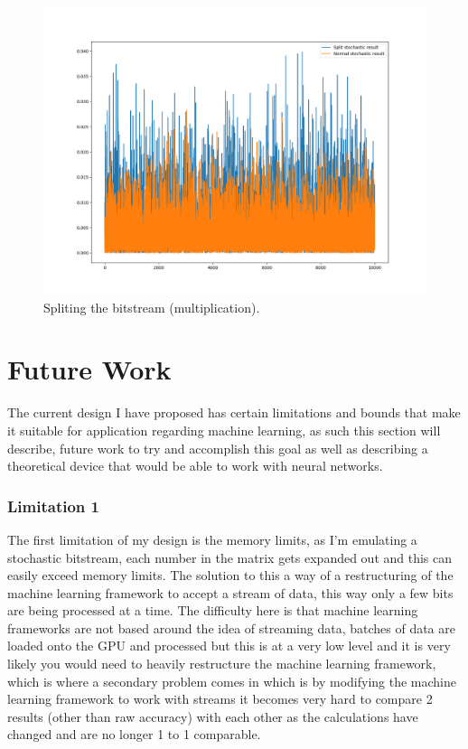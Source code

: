 \documentclass[a4paper,oneside,phd,etd]{BYUPhys}
\begin{document}
\begin{figure}[H]
\centering
\includegraphics[scale=0.4]{results/Figure_5.png}
\caption{Spliting the bitstream (multiplication).}
\label{fig:spliting}
\end{figure}

\chapter{Future Work}
The current design I have proposed has certain limitations and bounds that make it suitable for application regarding machine learning, as such this section will describe, future work to try and accomplish this goal as well as describing a theoretical device that would be able to work with neural networks.

\subsection{Limitation 1}
The first limitation of my design is the memory limits, as I'm emulating a stochastic bitstream, each number in the matrix gets expanded out and this can easily exceed memory limits. The solution to this a way of a restructuring of the machine learning framework to accept a stream of data, this way only a few bits are being processed at a time. The difficulty here is that machine learning frameworks are not based around the idea of streaming data, batches of data are loaded onto the GPU and processed but this is at a very low level and it is very likely you would need to heavily restructure the machine learning framework, which is where a secondary problem comes in which is by modifying the machine learning framework to work with streams it becomes very hard to compare 2 results (other than raw accuracy) with each other as the calculations have changed and are no longer 1 to 1 comparable.
\end{document}
